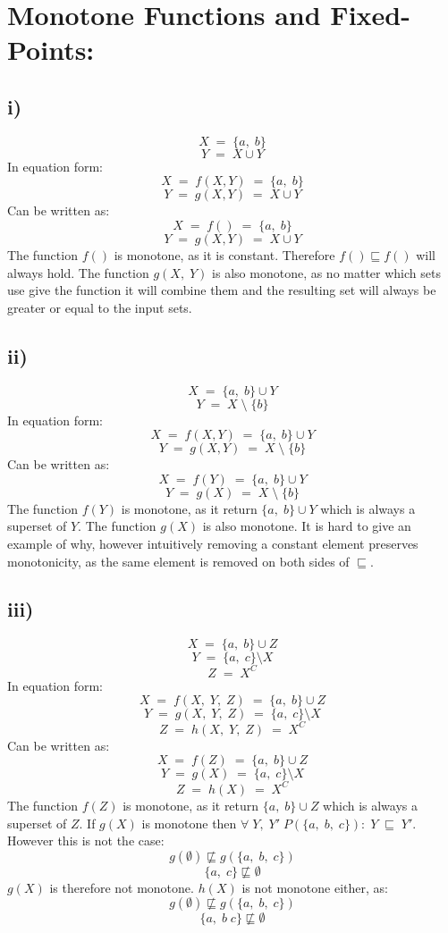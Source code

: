 \documentclass{article}
\begin{document}


\section*{Monotone Functions and Fixed-Points:}

\subsection*{i)}
$$X\;=\;\{a,\;b\}$$
$$Y\;=\;X\cup Y$$
In equation form:
$$X\;=\;f(X, Y)\;=\;\{a,\;b\}$$
$$Y\;=\;g(X, Y)\;=\;X\cup Y$$
Can be written as:
$$X\;=\;f()\;=\;\{a,\;b\}$$
$$Y\;=\;g(X, Y)\;=\;X\cup Y$$
The function $f()$ is monotone, as it is constant. Therefore $f() \sqsubseteq f()$ will always hold. The function $g(X,\;Y)$ is also monotone, as no matter which sets use give the function it will combine them and the resulting set will always be greater or equal to the input sets.

\subsection*{ii)}
$$X\;=\;\{a,\;b\}\cup Y$$
$$Y\;=\;X\;\setminus\;\{b\}$$
In equation form:
$$X\;=\;f(X, Y)\;=\;\{a,\;b\}\cup Y$$
$$Y\;=\;g(X, Y)\;=\;X\;\setminus\;\{b\}$$
Can be written as:
$$X\;=\;f(Y)\;=\;\{a,\;b\}\cup Y$$
$$Y\;=\;g(X)\;=\;X\;\setminus\;\{b\}$$
The function $f(Y)$ is monotone, as it return $\{a,\;b\}\cup Y$ which is always a superset of $Y$. The function $g(X)$ is also monotone. It is hard to give an example of why, however intuitively removing a constant element preserves monotonicity, as the same element is removed on both sides of $\sqsubseteq$.
\subsection*{iii)}
$$X\;=\;\{a,\;b\}\cup Z$$
$$Y\;=\;\{a,\;c\}\setminus X$$
$$Z\;=\;X^C$$
In equation form:
$$X\;=\;f(X,\;Y,\;Z)\;=\;\{a,\;b\}\cup Z$$
$$Y\;=\;g(X,\;Y,\;Z)\;=\;\{a,\;c\}\setminus X$$
$$Z\;=\;h(X,\;Y,\;Z)\;=\;X^C$$
Can be written as:
$$X\;=\;f(Z)\;=\;\{a,\;b\}\cup Z$$
$$Y\;=\;g(X)\;=\;\{a,\;c\}\setminus X$$
$$Z\;=\;h(X)\;=\;X^C$$
The function $f(Z)$ is monotone, as it return $\{a,\;b\}\cup Z$ which is always a superset of $Z$. If $g(X)$ is monotone then $\forall\;Y,\;Y'\;P(\{a,\;b,\;c\}):\;Y\;\sqsubseteq\;Y'$. However this is not the case:
$$g(\emptyset)\not\sqsubseteq g(\{a,\;b,\;c\})$$
$$\{a,\;c\}\not\sqsubseteq \emptyset$$
$g(X)$ is therefore not monotone. $h(X)$ is not monotone either, as:
$$g(\emptyset)\not\sqsubseteq g(\{a,\;b,\;c\})$$
$$\{a,\;b\;c\}\not\sqsubseteq \emptyset$$
\end{document}
